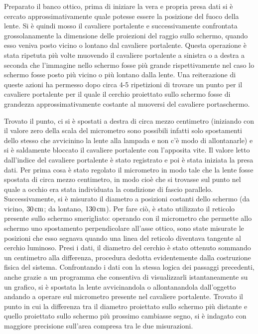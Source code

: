 Preparato il banco 
ottico, prima di iniziare la vera e propria presa dati si è cercato 
approssimativamente quale potesse essere la posizione del fuoco 
della lente. Si è quindi mosso il cavaliere portalente e 
successivamente confrontata grossolanamente la dimensione delle 
proiezioni del raggio sullo schermo, quando esso veniva posto vicino 
o lontano dal cavaliere portalente. Questa 
operazione è stata ripetuta più volte muovendo il cavaliere 
portalente a sinistra o a destra a seconda che l'immagine nello 
schermo fosse più grande rispettivamente nel caso lo schermo fosse 
posto più vicino o più lontano dalla lente. Una reiterazione di 
queste azioni ha permesso dopo circa 4-5 ripetizioni di trovare un 
punto per il cavaliere portalente per il quale il cerchio proiettato 
sullo schermo fosse di grandezza approssimativamente costante al 
muoversi del cavaliere portaschermo. 

Trovato il punto, ci si è spostati a destra di circa mezzo centimetro (iniziando con il 
valore zero della scala del micrometro sono possibili infatti solo 
spostamenti dello stesso che avvicinino la lente alla lampada e non 
c'è modo di allontanarle) e si è saldamente bloccato il cavaliere 
portalente con l'apposita vite. Il valore letto dall'indice del 
cavaliere portalente è stato registrato e poi è stata iniziata la 
presa dati. Per prima cosa è stato regolato il 
micrometro in modo tale che la lente fosse spostata di circa mezzo 
centimetro, in modo cioè che si trovasse sul punto nel quale a 
occhio era stata individuata la condizione di fascio parallelo. 
Successivamente, si è misurato il diametro a posizioni costanti 
dello schermo (da vicino, $30\,\mathrm{cm}$; da lontano, $130\,\mathrm{cm}$). Per fare 
ciò, è stato utilizzato il reticolo presente sullo schermo 
smerigliato: operando con il micrometro che permette allo schermo 
uno spostamento perpendicolare all'asse ottico, sono state misurate 
le posizioni che esso segnava quando una linea del reticolo 
diventava tangente al cerchio luminoso. Presi i dati, il diametro 
del cerchio \`e stato ottenuto sommando un centimetro alla 
differenza, procedura dedotta evidentemente	 dalla costruzione fisica 
del sistema. Confrontando i dati con la stessa logica dei passaggi 
precedenti, anche grazie a un programma che consentiva di 
visualizzarli istantaneamente su un grafico, si è spostata la lente 
avvicinandola o allontanandola dall'oggetto andando a operare sul 
micrometro presente nel cavaliere portalente. Trovato il punto in 
cui la differenza tra il diametro proiettato sullo schermo più 
distante e quello proiettato sullo schermo più prossimo cambiasse 
segno, si è indagato con maggiore precisione sull'area compresa tra 
le due misurazioni.


